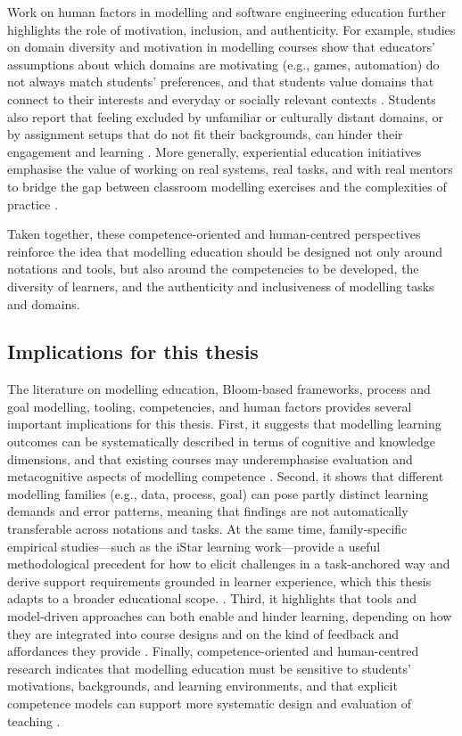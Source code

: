 Work on human factors in modelling and software engineering education further highlights the role of motivation, inclusion, and authenticity. For example, studies on domain diversity and motivation in modelling courses show that educators' assumptions about which domains are motivating (e.g., games, automation) do not always match students' preferences, and that students value domains that connect to their interests and everyday or socially relevant contexts \cite{grassl2026dei}. Students also report that feeling excluded by unfamiliar or culturally distant domains, or by assignment setups that do not fit their backgrounds, can hinder their engagement and learning \cite{grassl2026dei}. More generally, experiential education initiatives emphasise the value of working on real systems, real tasks, and with real mentors to bridge the gap between classroom modelling exercises and the complexities of practice \cite{holmes2018dimensions}.

Taken together, these competence-oriented and human-centred perspectives reinforce the idea that modelling education should be designed not only around notations and tools, but also around the competencies to be developed, the diversity of learners, and the authenticity and inclusiveness of modelling tasks and domains.

\subsection{Implications for this thesis}
\label{subsec:modelling_education_implications}

The literature on modelling education, Bloom-based frameworks, process and goal modelling, tooling, competencies, and human factors provides several important implications for this thesis. First, it suggests that modelling learning outcomes can be systematically described in terms of cognitive and knowledge dimensions, and that existing courses may underemphasise evaluation and metacognitive aspects of modelling competence \cite{bogdanova2019camelot, bogdanova2017domain, bork2019framework}. Second, it shows that different modelling families (e.g., data, process, goal) can pose partly distinct learning demands and error patterns, meaning that findings are not automatically transferable across notations and tasks. At the same time, family-specific empirical studies—such as the iStar learning work—provide a useful methodological precedent for how to elicit challenges in a task-anchored way and derive support requirements grounded in learner experience, which this thesis adapts to a broader educational scope. \cite{istar-learning, bpmn-education}. Third, it highlights that tools and model-driven approaches can both enable and hinder learning, depending on how they are integrated into course designs and on the kind of feedback and affordances they provide \cite{liebel2017model,human-factors-mde}. Finally, competence-oriented and human-centred research indicates that modelling education must be sensitive to students' motivations, backgrounds, and learning environments, and that explicit competence models can support more systematic design and evaluation of teaching \cite{chakraborty2022perceptions,holmes2018dimensions,sedelmaier2013research}.


